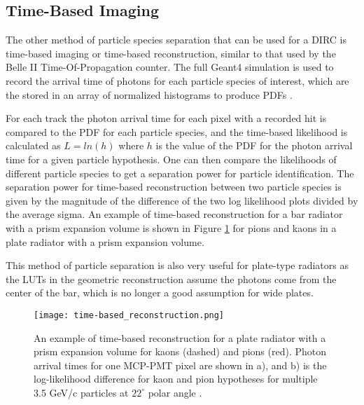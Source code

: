 \subsection{Time-Based Imaging}
The other method of particle species separation that can be used for a DIRC is time-based imaging or time-based reconstruction, similar to that used by the Belle II Time-Of-Propagation counter. The full Geant4 simulation is used to record the arrival time of photons for each particle species of interest, which are the stored in an array of normalized histograms to produce PDFs \cite{PANDA_barrel}.

For each track the photon arrival time for each pixel with a recorded hit is compared to the PDF for each particle species, and the time-based likelihood is calculated as $L = ln(h)$ where $h$ is the value of the PDF for the photon arrival time for a given particle hypothesis. One can then compare the likelihoods of different particle species to get a separation power for particle identification. The separation power for time-based reconstruction between two particle species is given by the magnitude of the difference of the two log likelihood plots divided by the average sigma. An example of time-based reconstruction for a bar radiator with a prism expansion volume is shown in Figure \ref{fig:time-based_reco} for pions and kaons in a plate radiator with a prism expansion volume.

This method of particle separation is also very useful for plate-type radiators as the LUTs in the geometric reconstruction assume the photons come from the center of the bar, which is no longer a good assumption for wide plates. 

\begin{figure}[!htb]
	\centering
	\texttt{[image: time-based\_reconstruction.png]}
	\caption{An example of time-based reconstruction for a plate radiator with a prism expansion volume for kaons (dashed) and pions (red). Photon arrival times for one MCP-PMT pixel are shown in a), and b) is the log-likelihood difference for kaon and pion hypotheses for multiple 3.5 GeV/c particles at $22^\circ$ polar angle \cite{PANDA_barrel}.}
	\label{fig:time-based_reco}
\end{figure}